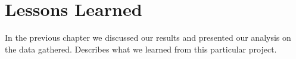 \section{Lessons Learned}
	In the previous chapter we discussed our results and presented our analysis on the data gathered. Describes what we learned from this particular project.